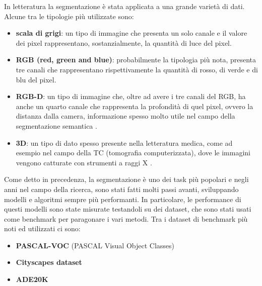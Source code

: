 In letteratura la segmentazione è stata applicata a una grande varietà di dati. Alcune tra le tipologie più utilizzate sono: 
\begin{itemize}
    \item \textbf{scala di grigi}: un tipo di immagine che presenta un solo canale e il valore dei pixel rappresentano, sostanzialmente, la quantità di luce del pixel.
    
    \item \textbf{RGB (red, green and blue)}: probabilmente la tipologia più nota, presenta tre canali che rappresentano rispettivamente la quantità di rosso, di verde e di blu del pixel.
    
    \item \textbf{RGB-D}: un tipo di immagine che, oltre ad avere i tre canali del RGB, ha anche un quarto canale che rappresenta la profondità di quel pixel, ovvero la distanza dalla camera, informazione spesso molto utile nel campo della segmentazione semantica \cite{qi20173d}.
    
    \item \textbf{3D}: un tipo di dato spesso presente nella letteratura medica, come ad esempio nel campo della TC (tomografia computerizzata), dove le immagini vengono catturate con strumenti a raggi X \cite{hu2001automatic}.
\end{itemize}
Come detto in precedenza, la segmentazione è uno dei task più popolari e negli anni nel campo della ricerca, sono stati fatti molti passi avanti, sviluppando modelli e algoritmi sempre più performanti. In particolare, le performance di questi modelli sono state misurate testandoli su dei dataset, che sono stati usati come benchmark per paragonare i vari metodi. Tra i dataset di benchmark più noti ed utilizzati ci sono:
\begin{itemize}
    \item \textbf{PASCAL-VOC} (PASCAL Visual Object Classes) \cite{pascal-voc}
    \item \textbf{Cityscapes dataset} \cite{cityscapes}
    \item \textbf{ADE20K} \cite{zhou2019semantic}
\end{itemize}
